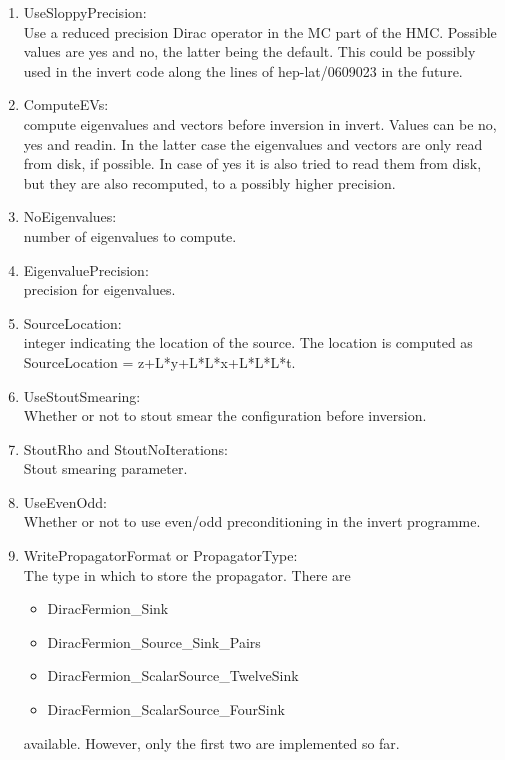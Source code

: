 \begin{enumerate}
\item {\ttfamily UseSloppyPrecision}:\\
  Use a reduced precision Dirac operator in the MC part of the
  HMC. Possible values are yes and no, the latter being the
  default. This could be possibly used in the invert code along the 
  lines of {\ttfamily hep-lat/0609023} in the future.

\item {\ttfamily ComputeEVs}:\\
  compute eigenvalues and vectors before inversion in invert. Values
  can be no, yes and readin. In the latter case the eigenvalues and
  vectors are only read from disk, if possible. In case of yes it is
  also tried to read them from disk, but they are also recomputed, to
  a possibly higher precision.

\item {\ttfamily NoEigenvalues}:\\
  number of eigenvalues to compute.

\item {\ttfamily EigenvaluePrecision}:\\
  precision for eigenvalues.

\item {\ttfamily SourceLocation}:\\
  integer indicating the location of the source. The location is computed as
  {\ttfamily SourceLocation = z+L*y+L*L*x+L*L*L*t}.

\item {\ttfamily UseStoutSmearing}:\\
  Whether or not to stout smear the configuration before inversion.

\item {\ttfamily StoutRho} and {\ttfamily StoutNoIterations}:\\
  Stout smearing parameter.

\item {\ttfamily UseEvenOdd}:\\
  Whether or not to use even/odd preconditioning in the invert
  programme.

\item {\ttfamily WritePropagatorFormat} or {\ttfamiliy PropagatorType}:\\
  The type in which to store the propagator. There are 
  \begin{itemize}
  \item {\ttfamily DiracFermion\_Sink}
  \item {\ttfamily DiracFermion\_Source\_Sink\_Pairs}
  \item {\ttfamily DiracFermion\_ScalarSource\_TwelveSink}
  \item {\ttfamily DiracFermion\_ScalarSource\_FourSink}
  \end{itemize}
  available. However, only the first two are implemented so far.


\end{enumerate}

